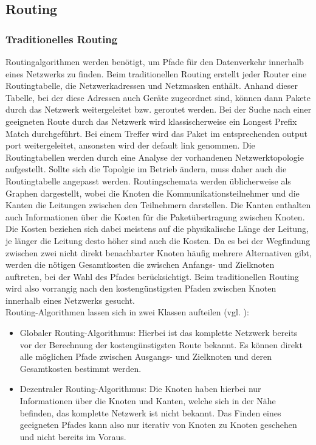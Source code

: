 
\subsection{Routing}
\subsubsection{Traditionelles Routing}
Routingalgorithmen werden benötigt, um Pfade für den Datenverkehr innerhalb eines Netzwerks zu finden. Beim traditionellen Routing erstellt jeder Router eine Routingtabelle, die Netzwerkadressen und Netzmasken enthält. Anhand dieser Tabelle, bei der diese Adressen auch Geräte zugeordnet sind, können dann Pakete durch das Netzwerk weitergeleitet bzw. geroutet werden. Bei der Suche nach einer geeigneten Route durch das Netzwerk wird klassischerweise ein Longest Prefix Match durchgeführt. Bei einem Treffer wird das Paket im entsprechenden output port weitergeleitet, ansonsten wird der default link genommen. Die Routingtabellen werden durch eine Analyse der vorhandenen Netzwerktopologie aufgestellt. Sollte sich die Topolgie im Betrieb ändern, muss daher auch die Routingtabelle angepasst werden. Routingschemata werden üblicherweise als Graphen dargestellt, wobei die Knoten die Kommunikationsteilnehmer und die Kanten die Leitungen zwischen den Teilnehmern darstellen. Die Kanten enthalten auch Informationen über die Kosten für die Paketübertragung zwischen Knoten. Die Kosten beziehen sich dabei meistens auf die physikalische Länge der Leitung, je länger die Leitung desto höher sind auch die Kosten. Da es bei der Wegfindung zwischen zwei nicht direkt benachbarter Knoten häufig mehrere Alternativen gibt, werden die nötigen Gesamtkosten die zwischen Anfangs- und Zielknoten auftreten, bei der Wahl des Pfades berücksichtigt. Beim traditionellen Routing wird also vorrangig nach den kostengünstigsten Pfaden zwischen Knoten innerhalb eines Netzwerks gesucht.
\\Routing-Algorithmen lassen sich in zwei Klassen aufteilen (vgl. \citet[S. 394]{Kurose2008}):
\begin{itemize}
\item Globaler Routing-Algorithmus: Hierbei ist das komplette Netzwerk bereits vor der Berechnung der kostengünstigsten Route bekannt. Es können direkt alle möglichen Pfade zwischen Ausgangs- und Zielknoten und deren Gesamtkosten bestimmt werden.
\item Dezentraler Routing-Algorithmus: Die Knoten haben hierbei nur Informationen über die Knoten und Kanten, welche sich in der Nähe befinden, das komplette Netzwerk ist nicht bekannt. Das Finden eines geeigneten Pfades kann also nur iterativ von Knoten zu Knoten geschehen und nicht bereits im Voraus.  
\end{itemize}
